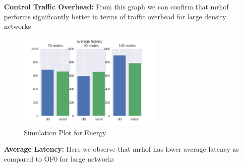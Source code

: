 \textbf{Control Traffic Overhead: }From this graph we can confirm that mrhof performs significantly better in terms of traffic overhead for large density networks
\begin{figure}[H]
\centering
\includegraphics[width=70mm]{average latency.png}
\caption{Simulation Plot for Energy}
\end{figure}
\textbf{Average Latency: }Here we observe that mrhof has lower average latency as compared to OF0 for large networks
